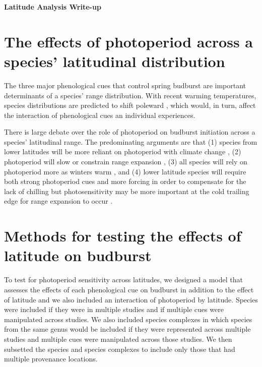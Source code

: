 \documentclass{article}\usepackage[]{graphicx}\usepackage[]{color}
\begin{document}
\noindent \textbf{\Large{Latitude Analysis Write-up}}
\section*{The effects of photoperiod across a species' latitudinal distribution}
The three major phenological cues that control spring budburst \citep[i.e., low winter temperatures, warm spring temperatures and increasing daylengths][]{Chuine2010} are important determinants of a species' range distribution. With recent warming temperatures, species distributions are predicted to shift poleward \citep{Chen2011, Chuine2001, Parmesan1999}, which would, in turn, affect the interaction of phenological cues an individual experiences. 

There is large debate over the role of photoperiod on budburst initiation across a species' latitudinal range. The predominating arguments are that (1) species from lower latitudes will be more reliant on photoperiod with climate change \citep{Zohner2016}, (2) photoperiod will slow or constrain range expansion \citep{Saikkonen2012}, (3) all species will rely on photoperiod more as winters warm \citep{Way2015}, and (4) lower latitude species will require both strong photoperiod cues and more forcing in order to compensate for the lack of chilling but photosensitivity may be more important at the cold trailing edge for range expansion to occur \citep{Gauzere2017}.


\section*{Methods for testing the effects of latitude on budburst}
To test for photoperiod sensitivity across latitudes, we designed a model that assesses the effects of each phenological cue on budburst in addition to the effect of latitude and we also included an interaction of photoperiod by latitude. Species were included if they were in multiple studies and if multiple cues were manipulated across studies. We also included species complexes in which species from the same genus would be included if they were represented across multiple studies and multiple cues were manipulated across those studies. We then subsetted the species and species complexes to include only those that had multiple provenance locations. 
\end{document}
